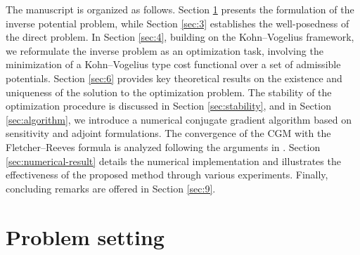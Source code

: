 \documentclass[a4paper,12pt,reqno,natbib]{amsart}
\begin{document}
The manuscript is organized as follows. Section \ref{sec:2} presents the formulation of the inverse potential problem, while Section \ref{sec:3} establishes the well-posedness of the direct problem. In Section \ref{sec:4}, building on the Kohn–Vogelius framework, we reformulate the inverse problem as an optimization task, involving the minimization of a Kohn–Vogelius type cost functional over a set of admissible potentials. Section \ref{sec:6} provides key theoretical results on the existence and uniqueness of the solution to the optimization problem. The stability of the optimization procedure is discussed in Section \ref{sec:stability}, and in Section \ref{sec:algorithm}, we introduce a numerical conjugate gradient algorithm based on sensitivity and adjoint formulations. The convergence of the CGM with the Fletcher–Reeves formula \cite{fletcher1964function} is analyzed following the arguments in \cite{dai1996convergence}. Section \ref{sec:numerical-result} details the numerical implementation and illustrates the effectiveness of the proposed method through various experiments. Finally, concluding remarks are offered in Section \ref{sec:9}.

\section{Problem setting}\label{sec:2}
\end{document}
